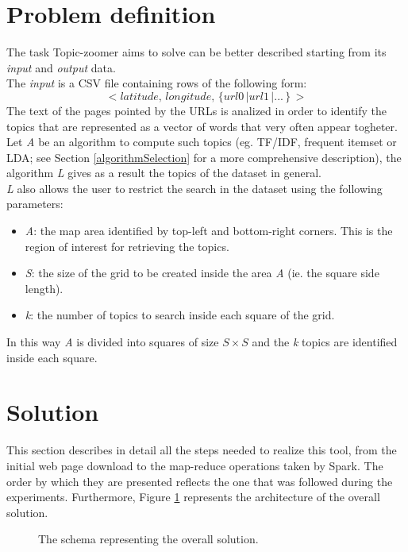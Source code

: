 \documentclass{sig-alternate-05-2015}
\begin{document}
\section{Problem definition}
The task Topic-zoomer aims to solve can be better described starting from its \emph{input} and \emph{output} data.\\
The \emph{input} is a CSV file containing rows of the following form:
\begin{equation}\label{dataset}
    <latitude,\,longitude,\,\{url0\,|url1\,|...\,\}\,>
\end{equation}
The text of the pages pointed by the URLs is analized in order to identify the topics that are represented as a vector of words that very often appear togheter.\\
Let \emph{A} be an algorithm to compute such topics (eg. TF/IDF, frequent itemset or LDA; see Section \ref{algorithmSelection} for a more comprehensive description), the algorithm \emph{L} gives as a result the topics of the dataset in general.\\
\emph{L} also allows the user to restrict the search in the dataset using the following parameters:
\begin{itemize}
    \item \emph{A}: the map area identified by top-left and bottom-right corners. This is the region of interest for retrieving the topics. 
    \item \emph{S}: the size of the grid to be created inside the area \emph{A} (ie. the square side length).
    \item \emph{k}: the number of topics to search inside each square of the grid.
\end{itemize}
In this way \emph{A} is divided into squares of size $S \times S$ and the \emph{k} topics are identified inside each square.


\section{Solution}
This section describes in detail all the steps needed to realize this tool, from the initial web page download to the map-reduce operations taken by Spark. The order by which they are presented reflects the one that was followed during the experiments. Furthermore, Figure \ref{solution} represents the architecture of the overall solution.
\begin{figure}
  \caption{The schema representing the overall solution.}
  \label{solution}
\end{figure}
\end{document}
